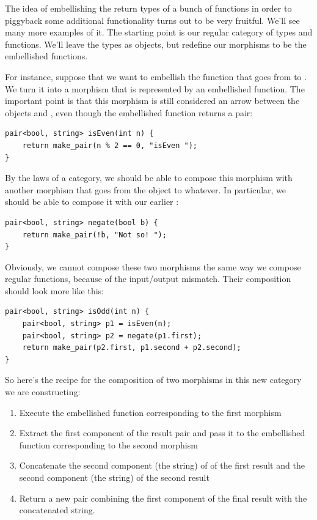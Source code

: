The idea of embellishing the return types of a bunch of functions in
order to piggyback some additional functionality turns out to be very
fruitful. We'll see many more examples of it. The starting point is our
regular category of types and functions. We'll leave the types as
objects, but redefine our morphisms to be the embellished functions.

For instance, suppose that we want to embellish the function
 that goes from  to . We turn it
into a morphism that is represented by an embellished function. The
important point is that this morphism is still considered an arrow
between the objects  and , even though the
embellished function returns a pair:

\begin{Verbatim}[commandchars=\\\{\}]
pair<bool, string> isEven(int n) {
    return make_pair(n % 2 == 0, "isEven ");
}
\end{Verbatim}
By the laws of a category, we should be able to compose this morphism
with another morphism that goes from the object  to
whatever. In particular, we should be able to compose it with our
earlier :

\begin{Verbatim}[commandchars=\\\{\}]
pair<bool, string> negate(bool b) {
    return make_pair(!b, "Not so! ");
}
\end{Verbatim}
Obviously, we cannot compose these two morphisms the same way we compose
regular functions, because of the input/output mismatch. Their
composition should look more like this:

\begin{Verbatim}[commandchars=\\\{\}]
pair<bool, string> isOdd(int n) {
    pair<bool, string> p1 = isEven(n);
    pair<bool, string> p2 = negate(p1.first);
    return make_pair(p2.first, p1.second + p2.second);
}
\end{Verbatim}
So here's the recipe for the composition of two morphisms in this new
category we are constructing:

\begin{enumerate}
\tightlist
\item
  Execute the embellished function corresponding to the first morphism
\item
  Extract the first component of the result pair and pass it to the
  embellished function corresponding to the second morphism
\item
  Concatenate the second component (the string) of of the first result
  and the second component (the string) of the second result
\item
  Return a new pair combining the first component of the final result
  with the concatenated string.
\end{enumerate}

